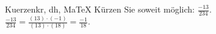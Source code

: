 \begin{MAufgabe}{Kuerzen}{kr, dh, MaTeX}
K\"urzen Sie soweit m\"oglich: $\frac{-13}{234}$.\\ 
\ifLsg\MLoesung
\quad $\frac{-13}{234}=\frac{(13)\cdot(-1)}{(13)\cdot(18)}=\frac{-1}{18}$.\else\relax\fi
 \end{MAufgabe}